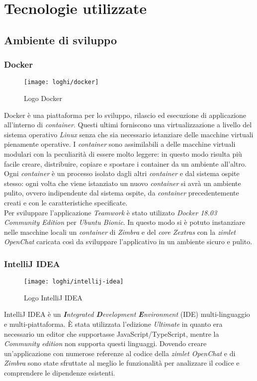 
\chapter{Tecnologie utilizzate}\label{chap:tec}
\section{Ambiente di sviluppo}
\subsection{Docker}
	\begin{figure}[H] 
		\centering
		\texttt{[image: loghi/docker]}
		\caption{Logo Docker}
	\end{figure}
Docker è una piattaforma per lo sviluppo, rilascio ed esecuzione di applicazione 
all'interno di \emph{container}. Questi ultimi forniscono una virtualizzazione a livello 
del sistema operativo \emph{Linux} senza che sia necessario istanziare delle macchine 
virtuali pienamente operative.
I \emph{container} sono assimilabili a delle macchine virtuali modulari con la peculiarità 
di essere molto leggere: in questo modo risulta più facile creare, distribuire, 
copiare e spostare i container da un ambiente all'altro.
Ogni \emph{container} è un processo isolato dagli altri \emph{container} e dal sistema ospite stesso: ogni volta che viene istanziato un nuovo \emph{container} si avrà un ambiente pulito, ovvero indipendente dal sistema ospite, da \emph{container} precedentemente creati e con le caratteristiche specificate. \\
Per sviluppare l'applicazione \emph{Teamwork} è stato utilizato \emph{Docker 18.03 Community Edition} per \emph{Ubuntu Bionic}. In questo modo si è potuto instanziare nelle macchine locali un \emph{container} di \emph{Zimbra} e del \emph{core Zextras} con la \emph{zimlet OpenChat} caricata così da sviluppare l'applicativo in un ambiente sicuro e pulito.

\subsection{IntelliJ IDEA} \label{subsec:IntelliJ}
	\begin{figure}[H] 
		\centering
		\texttt{[image: loghi/intellij-idea]}
		\caption{Logo IntelliJ IDEA}
	\end{figure}
IntelliJ IDEA è un \emph{\textbf{I}ntegrated \textbf{D}evelopment \textbf{E}nvironment} (\acrshort{IDE}) multi-linguaggio e multi-piattaforma. 
È stata utilizzata l'edizione \emph{Ultimate} in quanto era necessario un editor che 
supportasse JavaScript/TypeScript, mentre la \emph{Community edition} non supporta questi linguaggi. 
Dovendo creare un'applicazione con numerose referenze al codice della \emph{zimlet 
OpenChat} e di \emph{Zimbra} sono state sfruttate al meglio le funzionalità per 
analizzare il codice e comprendere le dipendenze esistenti.

